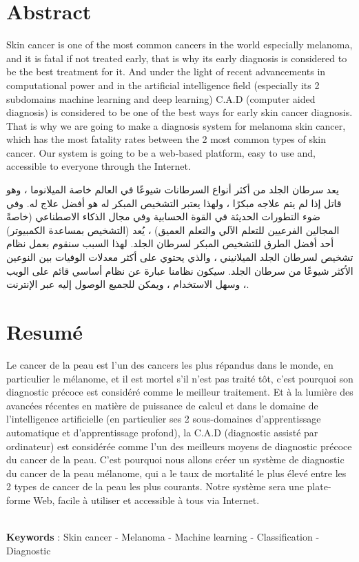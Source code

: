 \section*{Abstract}

Skin cancer is one of the most common cancers in the world especially melanoma, and it is fatal if not treated early, that is why its early diagnosis is considered to be the best treatment for it. And under the light of recent advancements in computational power and in the artificial intelligence field (especially its 2 subdomains machine learning and deep learning) C.A.D (computer aided diagnosis) is considered to be one of the best ways for early skin cancer diagnosis. That is why we are going to make a diagnosis system for melanoma skin cancer, which has the most fatality rates between the 2 most common types of skin cancer. Our system is going to be  a web-based platform, easy to use and, accessible to everyone through the Internet.

\begin{center}
\end{center}
\begin{RLtext}

    يعد سرطان الجلد من أكثر أنواع السرطانات شيوعًا في العالم خاصة الميلانوما ، وهو قاتل إذا لم يتم علاجه مبكرًا ، ولهذا يعتبر التشخيص المبكر له هو أفضل علاج له. وفي ضوء التطورات الحديثة في القوة الحسابية وفي مجال الذكاء الاصطناعي (خاصةً المجالين الفرعيين للتعلم الآلي والتعلم العميق) ، يُعد  (التشخيص بمساعدة الكمبيوتر) أحد أفضل الطرق للتشخيص المبكر لسرطان الجلد. لهذا السبب سنقوم بعمل نظام تشخيص لسرطان الجلد الميلانيني ، والذي يحتوي على أكثر معدلات الوفيات بين النوعين الأكثر شيوعًا من سرطان الجلد. سيكون نظامنا عبارة عن نظام أساسي قائم على الويب ، وسهل الاستخدام ، ويمكن للجميع الوصول إليه عبر الإنترنت.

\end{RLtext}



\section*{Resumé}
Le cancer de la peau est l'un des cancers les plus répandus dans le monde, en particulier le mélanome, et il est mortel s'il n'est pas traité tôt, c'est pourquoi son diagnostic précoce est considéré comme le meilleur traitement. Et à la lumière des avancées récentes en matière de puissance de calcul et dans le domaine de l'intelligence artificielle (en particulier ses 2 sous-domaines d'apprentissage automatique et d'apprentissage profond), la C.A.D (diagnostic assisté par ordinateur) est considérée comme l'un des meilleurs moyens de diagnostic précoce du cancer de la peau. C'est pourquoi nous allons créer un système de diagnostic du cancer de la peau mélanome, qui a le taux de mortalité le plus élevé entre les 2 types de cancer de la peau les plus courants. Notre système sera une plate-forme Web, facile à utiliser et accessible à tous via Internet.

\bigskip
\vspace{1cm}
\hrulefill \\
\textbf{Keywords} : Skin cancer - Melanoma - Machine learning - Classification - Diagnostic \\
\vspace{1cm}
\hrulefill \\